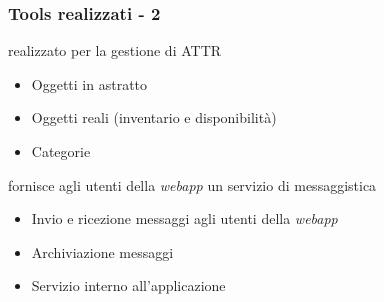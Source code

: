 \begin{frame}
\frametitle{Tools realizzati - 2}
\begin{block}{}
\begin{description}[Communicator]
\item [Attrezzature] realizzato per la gestione di ATTR 
\begin{itemize}
\item Oggetti in astratto
\item Oggetti reali (inventario e disponibilità)
\item Categorie
\end{itemize}
\item [Communicator] fornisce agli utenti della \emph{webapp}
un servizio di messaggistica
\begin{itemize}
\item Invio e ricezione messaggi agli utenti della \emph{webapp}
\item Archiviazione messaggi
\item Servizio interno all'applicazione
\end{itemize}
\end{description}
\end{block}
\end{frame}



